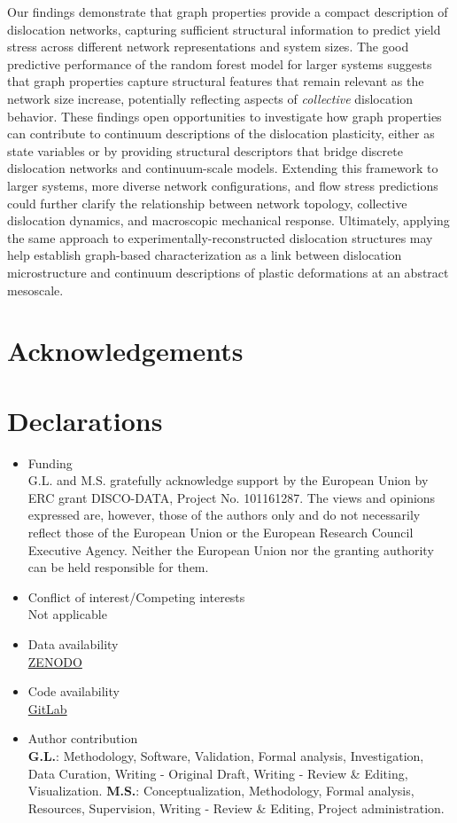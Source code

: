 \documentclass[pdflatex,sn-mathphys-num]{sn-jnl}%
\theoremstyle{thmstyleone}%
\theoremstyle{thmstyletwo}%
\theoremstyle{thmstylethree}%
\begin{document}
Our findings demonstrate that graph properties provide a compact description of dislocation networks, capturing sufficient structural information to predict yield stress across different network representations and system sizes.
The good predictive performance of the random forest model for larger systems suggests that graph properties capture structural features that remain relevant as the network size increase, potentially reflecting aspects of \textit{collective} dislocation behavior.
These findings open opportunities to investigate how graph properties can contribute to continuum descriptions of the dislocation plasticity, either as state variables or by providing structural descriptors that bridge discrete dislocation networks and continuum-scale models.
Extending this framework to larger systems, more diverse network configurations, and flow stress predictions could further clarify the relationship between network topology, collective dislocation dynamics, and macroscopic mechanical response.
Ultimately, applying the same approach to experimentally-reconstructed dislocation structures may help establish graph-based characterization as a link between dislocation microstructure and continuum descriptions of plastic deformations at an abstract mesoscale.

\section*{Acknowledgements}

\section*{Declarations}
\begin{itemize}
	\item Funding\\
	G.L. and M.S. gratefully acknowledge support by the European Union by ERC grant DISCO-DATA, Project No. 101161287. The views and opinions expressed are, however, those of the authors only and do not necessarily reflect those of the European Union or the European Research Council Executive Agency. Neither the European Union nor the granting authority can be held responsible for them.
	\item Conflict of interest/Competing interests\\
	Not applicable
	\item Data availability\\
	\href{https://doi.org/10.5281/zenodo.24006153}{ZENODO}
	\item Code availability\\
	\href{https://gitlab.ruhr-uni-bochum.de/icams-mids/dislocation_graps.git}{GitLab}
	\item Author contribution\\
	\textbf{G.L.}: Methodology, Software, Validation, Formal analysis, Investigation, Data Curation, Writing - Original Draft, Writing - Review \& Editing, Visualization. \textbf{M.S.}: Conceptualization, Methodology, Formal analysis, Resources, Supervision, Writing - Review \& Editing, Project administration.
\end{itemize}
\end{document}
